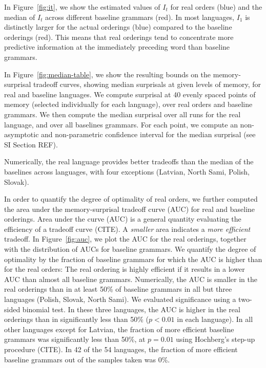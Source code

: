 In Figure~\ref{fig:it}, we show the estimated values of $I_t$ for real orders (blue) and the median of $I_t$ across different baseline grammars (red).
In most languages, $I_1$ is distinctly larger for the actual orderings (blue) compared to the baseline orderings (red). This means that real orderings tend to concentrate more predictive information at the immediately preceding word than baseline grammars.

In Figure~\ref{fig:median-table}, we show the resulting bounds on the memory-surprisal tradeoff curves, showing median surprisals at given levels of memory, for real and baseline languages.
We compute surprisal at 40 evenly spaced points of memory (selected individually for each language), over real orders and baseline grammars.
We then compute the median surprisal over all runs for the real language, and over all baselines grammars.
For each point, we compute an non-asymptotic and non-parametric confidence interval for the median surprisal (see SI Section REF).

Numerically, the real language provides better tradeoffs than the median of the baselines across languages, with four exceptions (Latvian, North Sami, Polish, Slovak).


In order to quantify the degree of optimality of real orders, we further computed the area under the memory-surprisal tradeoff curve (AUC) for real and baseline orderings.
Area under the curve (AUC) is a general quantity evaluating the efficiency of a tradeoff curve (CITE).
A \emph{smaller} area indicates a \emph{more efficient} tradeoff.
In Figure~\ref{fig:auc}, we plot the AUC for the real orderings, together with the distribution of AUCs for baseline grammars.
We quantify the degree of optimality by the fraction of baseline grammars for which the AUC is higher than for the real orders:
The real ordering is highly efficient if it results in a lower AUC than almost all baseline grammars.
Numerically, the AUC is smaller in the real orderings than in at least 50\% of baseline grammars in all but three languages (Polish, Slovak, North Sami).
We evaluated significance using a two-sided binomial test.
In these three languages, the AUC is higher in the real orderings than in significantly less than 50\% ($p < 0.01$ in each language).
In all other languages except for Latvian, the fraction of more efficient baseline grammars was significantly less than 50\%, at $p=0.01$ using Hochberg's step-up procedure (CITE).
In 42 of the 54 languages, the fraction of more efficient baseline grammars out of the samples taken was 0\%.



